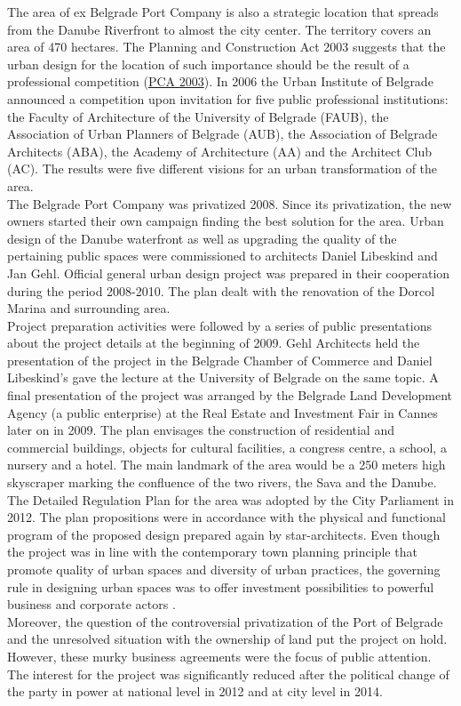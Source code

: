 \documentclass[11pt]{report}
\begin{document}
\begin{itemize}
The area of ex Belgrade Port Company is also a strategic location that spreads from the Danube Riverfront to almost the city center. The territory covers an area of 470 hectares.
The Planning and Construction Act 2003 suggests that the urban design for the location of such importance should be the result of a professional competition (\href{ref}{PCA 2003}).
In 2006 the Urban Institute of Belgrade announced a competition upon invitation for five public professional institutions: the  Faculty  of  Architecture  of  the  University  of  Belgrade (FAUB),  the Association  of  Urban  Planners  of  Belgrade (AUB),  the Association  of Belgrade Architects (ABA),  the  Academy  of  Architecture (AA)  and  the  Architect Club (AC). The results were five different visions for an urban transformation of the area.
\\
The  Belgrade Port Company was privatized 2008. Since its privatization,  the new owners started their own campaign finding the best solution for the area.
Urban design of the Danube waterfront as well as upgrading the quality of the pertaining public spaces were commissioned to architects Daniel Libeskind and Jan Gehl.
Official general urban design  project was prepared in their cooperation during the period 2008-2010.
The plan dealt with the renovation of the Dorcol Marina and surrounding area.
\\
Project preparation activities were followed by a series of public presentations about the project details at the beginning of 2009. Gehl Architects held the presentation of the project in the Belgrade Chamber of Commerce and Daniel Libeskind's gave the lecture at the University of Belgrade on the same topic.
A final presentation of the project was arranged by the Belgrade Land Development Agency (a public enterprise) at the Real Estate and Investment Fair in Cannes later on in 2009.
The  plan  envisages  the  construction of  residential  and  commercial  buildings,  objects for cultural facilities, a congress centre, a school, a nursery and a hotel.
The main landmark of the area would be a 250 meters high skyscraper marking the confluence of the two rivers, the Sava and the Danube.
\\
The  Detailed  Regulation Plan for the area was adopted by the City  Parliament in 2012. The plan propositions  were in accordance with the physical and functional program of the proposed design prepared again by star-architects.
Even though the project was in  line  with  the contemporary town planning principle that promote quality of urban spaces and diversity of urban practices, the governing rule in designing urban spaces was to offer investment possibilities to powerful business and corporate actors \cite{Vukmirovic in Doytchinov et al 2015}.
\\
Moreover, the question of the controversial privatization of the Port of Belgrade and the unresolved situation with the ownership of land put the project on hold. However, these murky business agreements were the focus of public attention.
The interest for the project was significantly reduced after the political change of the party in power at national level in 2012 and at city level in 2014. 


\end{itemize}
\end{document}
